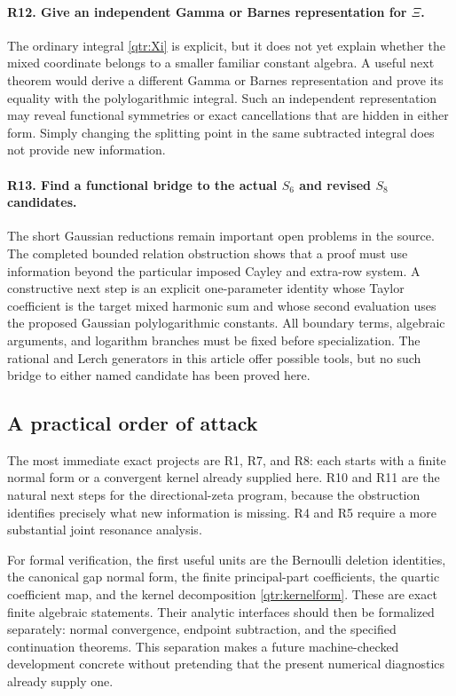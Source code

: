 \documentclass[11pt,a4paper]{article}
\numberwithin{equation}{section}
\theoremstyle{definition}
\theoremstyle{remark}
\begin{document}
\paragraph{R12. Give an independent Gamma or Barnes representation for \(\Xi\).}
The ordinary integral \eqref{qtr:Xi} is explicit, but it
does not yet explain whether the mixed coordinate
belongs to a smaller familiar constant algebra.
A useful next theorem would derive a different Gamma
or Barnes representation and prove its equality with
the polylogarithmic integral. Such an independent
representation may reveal functional symmetries or
exact cancellations that are hidden in either form.
Simply changing the splitting point in the same
subtracted integral does not provide new information.

\paragraph{R13. Find a functional bridge to the actual \(S_6\) and revised \(S_8\) candidates.}
The short Gaussian reductions remain important open
problems in the source. The completed bounded relation
obstruction shows that a proof must use information
beyond the particular imposed Cayley and extra-row
system. A constructive next step is an explicit
one-parameter identity whose Taylor coefficient is the
target mixed harmonic sum and whose second evaluation
uses the proposed Gaussian polylogarithmic constants.
All boundary terms, algebraic arguments, and logarithm
branches must be fixed before specialization. The
rational and Lerch generators in this article offer
possible tools, but no such bridge to either named
candidate has been proved here.

\subsection{A practical order of attack}

The most immediate exact projects are R1, R7, and R8:
each starts with a finite normal form or a convergent
kernel already supplied here. R10 and R11 are the
natural next steps for the directional-zeta program,
because the obstruction identifies precisely what
new information is missing. R4 and R5 require a more
substantial joint resonance analysis.

For formal verification, the first useful units are
the Bernoulli deletion identities, the canonical gap
normal form, the finite principal-part coefficients,
the quartic coefficient map, and the kernel decomposition
\eqref{qtr:kernelform}. These are exact finite algebraic
statements. Their analytic interfaces should then
be formalized separately: normal convergence,
endpoint subtraction, and the specified continuation
theorems. This separation makes a future machine-checked
development concrete without pretending that the
present numerical diagnostics already supply one.
\end{document}
